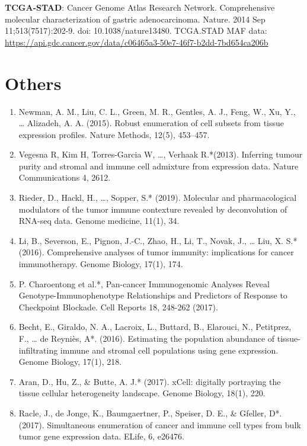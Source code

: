 \documentclass[
  12pt,
]{book}
\begin{document}
\textbf{TCGA-STAD}: Cancer Genome Atlas Research Network. Comprehensive molecular characterization of gastric adenocarcinoma. Nature. 2014 Sep 11;513(7517):202-9. doi: 10.1038/nature13480.
TCGA.STAD MAF data: \url{https://api.gdc.cancer.gov/data/c06465a3-50e7-46f7-b2dd-7bd654ca206b}

\hypertarget{others}{%
\section{Others}\label{others}}

\begin{enumerate}
\def\labelenumi{\arabic{enumi}.}
\item
  Newman, A. M., Liu, C. L., Green, M. R., Gentles, A. J., Feng, W., Xu, Y., \ldots{} Alizadeh, A. A. (2015). Robust enumeration of cell subsets from tissue expression profiles. Nature Methods, 12(5), 453--457.
\item
  Vegesna R, Kim H, Torres-Garcia W, \ldots, Verhaak R.*(2013). Inferring tumour purity and stromal and immune cell admixture from expression data. Nature Communications 4, 2612.
\item
  Rieder, D., Hackl, H., \ldots, Sopper, S.* (2019). Molecular and pharmacological modulators of the tumor immune contexture revealed by deconvolution of RNA-seq data. Genome medicine, 11(1), 34.
\item
  Li, B., Severson, E., Pignon, J.-C., Zhao, H., Li, T., Novak, J., \ldots{} Liu, X. S.* (2016). Comprehensive analyses of tumor immunity: implications for cancer immunotherapy. Genome Biology, 17(1), 174.
\item
  P. Charoentong et al.*, Pan-cancer Immunogenomic Analyses Reveal Genotype-Immunophenotype Relationships and Predictors of Response to Checkpoint Blockade. Cell Reports 18, 248-262 (2017).
\item
  Becht, E., Giraldo, N. A., Lacroix, L., Buttard, B., Elarouci, N., Petitprez, F., \ldots{} de Reyniès, A*. (2016). Estimating the population abundance of tissue-infiltrating immune and stromal cell populations using gene expression. Genome Biology, 17(1), 218.
\item
  Aran, D., Hu, Z., \& Butte, A. J.* (2017). xCell: digitally portraying the tissue cellular heterogeneity landscape. Genome Biology, 18(1), 220.
\item
  Racle, J., de Jonge, K., Baumgaertner, P., Speiser, D. E., \& Gfeller, D*. (2017). Simultaneous enumeration of cancer and immune cell types from bulk tumor gene expression data. ELife, 6, e26476.

\end{enumerate}
\end{document}
